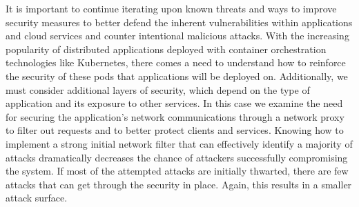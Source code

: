 

It is important to continue iterating upon known threats and ways to improve security measures to 
better defend the inherent vulnerabilities within applications and cloud services and counter 
intentional malicious attacks. With the increasing popularity of distributed applications deployed 
with container orchestration technologies like Kubernetes,  there comes a need to understand how 
to reinforce the security of these pods that applications will be deployed on. Additionally, we 
must consider additional layers of security, which depend on the type of application and its exposure 
to other services. In this case we examine the need for securing the application's network 
communications through a network proxy to filter out requests and to better protect clients and services. 
Knowing how to implement a strong initial network filter that can effectively identify a majority of 
attacks dramatically decreases the chance of attackers successfully compromising the system. If most of 
the attempted attacks are initially thwarted, there are few attacks that can get through the security in 
place. Again, this results in a smaller attack surface.

